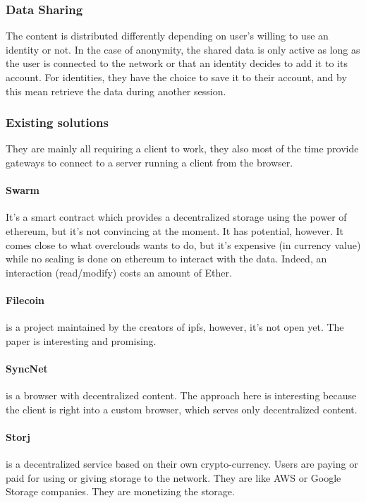 \subsubsection{Data Sharing} The content is distributed differently depending on user's willing to use an identity or not. In the case of anonymity, the shared data is only active as long as the user is connected to the network or that an identity decides to add it to its account. For identities, they have the choice to save it to their account, and by this mean retrieve the data during another session.

\subsubsection{Existing solutions} They are mainly all requiring a client to work, they also most of the time provide gateways to connect to a server running a client from the browser.

\paragraph{Swarm\cite{EthersphereIPFSSWARM}} It's a smart contract which provides a decentralized storage using the power of ethereum, but it's not convincing at the moment. It has potential, however. It comes close to what overclouds wants to do, but it's expensive (in currency value) while no scaling is done on ethereum to interact with the data. Indeed, an interaction (read/modify) costs an amount of Ether.

\paragraph{Filecoin\cite{2014Filecoin:Network}} is a project maintained by the creators of ipfs, however, it's not open yet. The paper is interesting and promising.

\paragraph{SyncNet\cite{MinardiSyncNet:Browser}} is a browser with decentralized content. The approach here is interesting because the client is right into a custom browser, which serves only decentralized content.

\paragraph{Storj\cite{WilkinsonStorjNetwork}} is a decentralized service based on their own crypto-currency. Users are paying or paid for using or giving storage to the network. They are like AWS or Google Storage companies. They are monetizing the storage.

